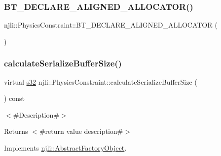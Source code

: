 \subsubsection{\texorpdfstring{B\+T\+\_\+\+D\+E\+C\+L\+A\+R\+E\+\_\+\+A\+L\+I\+G\+N\+E\+D\+\_\+\+A\+L\+L\+O\+C\+A\+T\+O\+R()}{BT\_DECLARE\_ALIGNED\_ALLOCATOR()}}
{\footnotesize\ttfamily njli\+::\+Physics\+Constraint\+::\+B\+T\+\_\+\+D\+E\+C\+L\+A\+R\+E\+\_\+\+A\+L\+I\+G\+N\+E\+D\+\_\+\+A\+L\+L\+O\+C\+A\+T\+OR (\begin{DoxyParamCaption}{ }\end{DoxyParamCaption})\hspace{0.3cm}{\ttfamily [protected]}}

\mbox{\label{classnjli_1_1_physics_constraint_aeda6c35ab271897cfe3192870d4ac7a4}} 
\subsubsection{\texorpdfstring{calculate\+Serialize\+Buffer\+Size()}{calculateSerializeBufferSize()}}
{\footnotesize\ttfamily virtual \mbox{\hyperlink{_util_8h_aa62c75d314a0d1f37f79c4b73b2292e2}{s32}} njli\+::\+Physics\+Constraint\+::calculate\+Serialize\+Buffer\+Size (\begin{DoxyParamCaption}{ }\end{DoxyParamCaption}) const\hspace{0.3cm}{\ttfamily [virtual]}}

$<$\#\+Description\#$>$

\begin{DoxyReturn}{Returns}
$<$\#return value description\#$>$ 
\end{DoxyReturn}


Implements \mbox{\hyperlink{classnjli_1_1_abstract_factory_object_a4763d05bc9dc37c559111f8bb30e1dd8}{njli\+::\+Abstract\+Factory\+Object}}.



